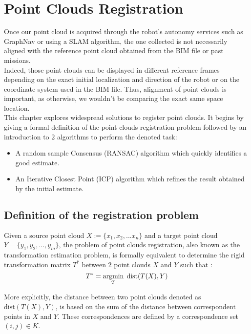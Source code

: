 \chapter{Point Clouds Registration}
Once our point cloud is acquired through the robot's autonomy services such as GraphNav or using a SLAM algorithm, the one collected is not necessarily aligned with the reference point cloud obtained from the BIM file or past missions.\\

Indeed, those point clouds can be displayed in different reference frames depending on the exact initial localization and direction of the robot or on the coordinate system used in the BIM file. Thus, alignment of point clouds is important, as otherwise, we wouldn't be comparing the exact same space location.\\

This chapter explores widespread solutions to register point clouds. It begins by giving a formal definition of the point clouds registration problem followed by an introduction to 2 algorithms to perform the denoted task:
\begin{itemize}
    \item A random sample Consensus (RANSAC) algorithm which quickly identifies a good estimate.
    \item An Iterative Closest Point (ICP) algorithm which refines the result obtained by the initial estimate.
\end{itemize}

\section{Definition of the registration problem}
Given a source point cloud $X := \{ x_1,x_2,...x_n\}$ and a target point cloud $Y = \{y_1,y_2,...,y_m\}$, the problem of point clouds registration, also known as the transformation estimation problem, is formally equivalent to determine the rigid transformation matrix $T^*$ between 2 point clouds $X$ and $Y$ such that \cite{Registration_review}:
\begin{equation}
    T^* = \operatorname*{argmin}_T \; \text{dist}(T(X), Y) 
\end{equation}

More explicitly, the distance between two point clouds denoted as $\text{dist}(T(X), Y)$, is based on the sum of the distance between correspondent points in $X$ and $Y$. These correspondences are defined by a correspondence set $(i,j) \in K$.\\

